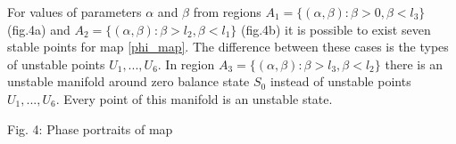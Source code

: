 \documentclass[12pt]{amsart}
\begin{document}
For values of parameters $ \alpha $ and $ \beta $ from regions $ A_1 = \{ (\alpha, \beta): \beta > 0, \beta < l_3 \} $ (fig.4a) and $ A_2 = \{ (\alpha, \beta): \beta > l_2, \beta < l_1 \} $ (fig.4b) it is possible to exist seven stable points for map \eqref{phi_map}. The difference between these cases is the types of unstable points $ U_1, ..., U_6 $. In region $ A_3 = \{ (\alpha, \beta): \beta > l_3, \beta < l_2 \} $ there is an unstable manifold around zero balance state $ S_0 $ instead of unstable points $ U_1, ..., U_6 $. Every point of this manifold is an unstable state.

\hspace{0.5cm}
\begin{minipage}[h]{0.45\linewidth}
\end{minipage}
\hspace{-1cm}
\begin{minipage}[h]{0.45\linewidth}
\end{minipage}
\begin{center}
	Fig. 4: Phase portraits of map
\end{center}
\end{document}
